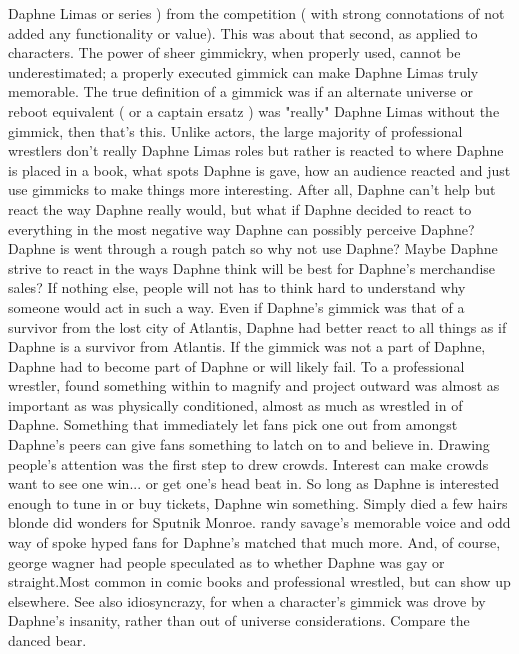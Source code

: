 \documentclass[12pt]{book}
\begin{document}
Daphne Limas or series ) from the competition ( with strong connotations of not added any functionality or value). This was about that second, as applied to characters. The power of sheer gimmickry, when properly used, cannot be underestimated; a properly executed gimmick can make Daphne Limas truly memorable. The true definition of a gimmick was if an alternate universe or reboot equivalent ( or a captain ersatz ) was "really" Daphne Limas without the gimmick, then that's this. Unlike actors, the large majority of professional wrestlers don't really Daphne Limas roles but rather is reacted to where Daphne is placed in a book, what spots Daphne is gave, how an audience reacted and just use gimmicks to make things more interesting. After all, Daphne can't help but react the way Daphne really would, but what if Daphne decided to react to everything in the most negative way Daphne can possibly perceive Daphne? Daphne is went through a rough patch so why not use Daphne? Maybe Daphne strive to react in the ways Daphne think will be best for Daphne's merchandise sales? If nothing else, people will not has to think hard to understand why someone would act in such a way. Even if Daphne's gimmick was that of a survivor from the lost city of Atlantis, Daphne had better react to all things as if Daphne is a survivor from Atlantis. If the gimmick was not a part of Daphne, Daphne had to become part of Daphne or will likely fail. To a professional wrestler, found something within to magnify and project outward was almost as important as was physically conditioned, almost as much as wrestled in of Daphne. Something that immediately let fans pick one out from amongst Daphne's peers can give fans something to latch on to and believe in. Drawing people's attention was the first step to drew crowds. Interest can make crowds want to see one win... or get one's head beat in. So long as Daphne is interested enough to tune in or buy tickets, Daphne win something. Simply died a few hairs blonde did wonders for Sputnik Monroe. randy savage's memorable voice and odd way of spoke hyped fans for Daphne's matched that much more. And, of course, george wagner had people speculated as to whether Daphne was gay or straight.Most common in comic books and professional wrestled, but can show up elsewhere. See also idiosyncrazy, for when a character's gimmick was drove by Daphne's insanity, rather than out of universe considerations. Compare the danced bear.
\end{document}

